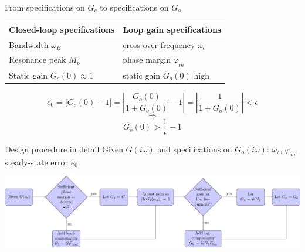 \documentclass[presentation,aspectratio=169, usenames, dvipsnames]{beamer}
\begin{document}
\begin{frame}[label={sec:org2d3fd3d}]{From specifications on \(G_c\) to specifications on \(G_o\)}
\begin{center}
\begin{center}
\begin{tabular}{ll}
Closed-loop specifications & Loop gain specifications\\
\hline
Bandwidth \(\omega_B\) & cross-over frequency \(\omega_c\)\\
Resonance peak \(M_p\) & phase margin \(\varphi_m\)\\
Static gain \(G_c(0) \approx 1\) & static gain \(G_o(0)\) high\\
\hline
\end{tabular}
\end{center}
\end{center}

\[ e_0 = |G_c(0)-1| = \left|\frac{G_o(0)}{1+G_o(0)}-1\right| = \left|\frac{1}{1+G_o(0)}\right| < \epsilon\] \[\Rightarrow\]  \[G_o(0) > \frac{1}{\epsilon} - 1\]
\end{frame}


\begin{frame}[label={sec:org97e3f19}]{Design procedure in detail}
Given \(G(i\omega)\) and specifications on \(G_o(i\omega)\): \(\omega_c\), \(\varphi_m\), steady-state error \(e_0\).

\begin{center}
\includegraphics[width=1.02\linewidth]{../figures/design-procedure}
\end{center}
\end{frame}
\end{document}
